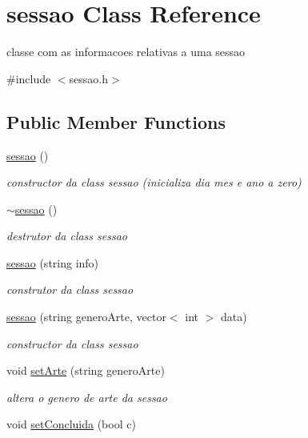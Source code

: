 \hypertarget{classsessao}{}\section{sessao Class Reference}
\label{classsessao}


classe com as informacoes relativas a uma sessao  




{\ttfamily \#include $<$sessao.\+h$>$}

\subsection*{Public Member Functions}
\begin{DoxyCompactItemize}
\item 
\hyperlink{classsessao_aeffd6315e32e04d53e0ae43b531bf185}{sessao} ()
\begin{DoxyCompactList}\small\item\em constructor da class sessao (inicializa dia mes e ano a zero) \end{DoxyCompactList}\item 
\hyperlink{classsessao_aa0c4f133563230ae0f975a3214134362}{$\sim$sessao} ()
\begin{DoxyCompactList}\small\item\em destrutor da class sessao \end{DoxyCompactList}\item 
\hyperlink{classsessao_af1c11649ff608dbc4d51e5189be9cec5}{sessao} (string info)
\begin{DoxyCompactList}\small\item\em construtor da class sessao \end{DoxyCompactList}\item 
\hyperlink{classsessao_a289b712ee7876adb7a838796e9bd5cb3}{sessao} (string genero\+Arte, vector$<$ int $>$ data)
\begin{DoxyCompactList}\small\item\em constructor da class sessao \end{DoxyCompactList}\item 
void \hyperlink{classsessao_a0924c2db7776396e07bdfe9e0f39d05f}{set\+Arte} (string genero\+Arte)
\begin{DoxyCompactList}\small\item\em altera o genero de arte da sessao \end{DoxyCompactList}\item 
void \hyperlink{classsessao_ad9af167622260d3b9804d926aade4249}{set\+Concluida} (bool c)

\end{DoxyCompactItemize}
